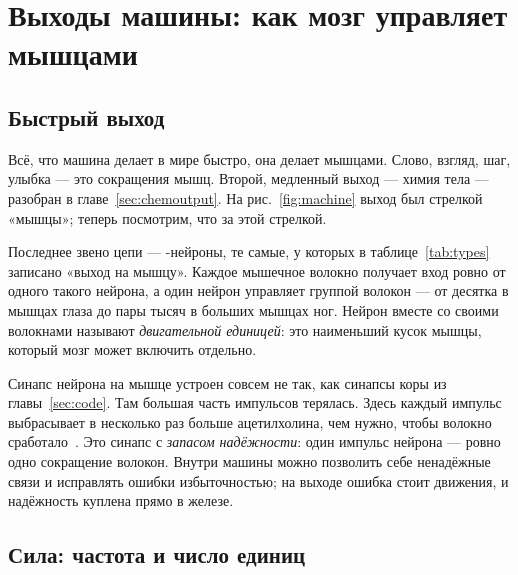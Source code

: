 \chapter{Выходы машины: как мозг управляет мышцами}
\label{sec:muscles}

\section{Быстрый выход}

Всё, что машина делает в мире быстро, она делает мышцами. Слово, взгляд, шаг, улыбка --- это сокращения мышц. Второй, медленный выход --- химия тела --- разобран в главе~\ref{sec:chemoutput}. На рис.~\ref{fig:machine} выход был стрелкой «мышцы»; теперь посмотрим, что за этой стрелкой.

Последнее звено цепи --- -нейроны, те самые, у которых в таблице~\ref{tab:types} записано «выход на мышцу». Каждое мышечное волокно получает вход ровно от одного такого нейрона, а один нейрон управляет группой волокон --- от десятка в мышцах глаза до пары тысяч в больших мышцах ног. Нейрон вместе со своими волокнами называют \emph{двигательной единицей}: это наименьший кусок мышцы, который мозг может включить отдельно.

Синапс нейрона на мышце устроен совсем не так, как синапсы коры из главы~\ref{sec:code}. Там большая часть импульсов терялась. Здесь каждый импульс выбрасывает в несколько раз больше ацетилхолина, чем нужно, чтобы волокно сработало~\cite{WoodSlater2001}. Это синапс с \emph{запасом надёжности}: один импульс нейрона --- ровно одно сокращение волокон. Внутри машины можно позволить себе ненадёжные связи и исправлять ошибки избыточностью; на выходе ошибка стоит движения, и надёжность куплена прямо в железе.

\section{Сила: частота и число единиц}

